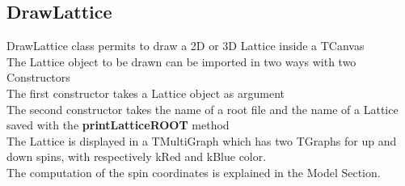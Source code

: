 \documentclass[11pt,a4paper]{article}
\begin{document}
\newpage

\subsection*{DrawLattice}

DrawLattice class permits to draw a 2D or 3D Lattice inside a TCanvas \\
The Lattice object to be drawn can be imported in two ways with two Constructors \\
The first constructor takes a Lattice object as argument \\
The second constructor takes the name of a root file and the name of a Lattice saved with the \textbf{printLatticeROOT} method \\
The Lattice is displayed in a TMultiGraph which has two TGraphs for up and down spins, with respectively kRed and kBlue color. \\ 
The computation of the spin coordinates is explained in the Model Section. 
         
\end{document}
